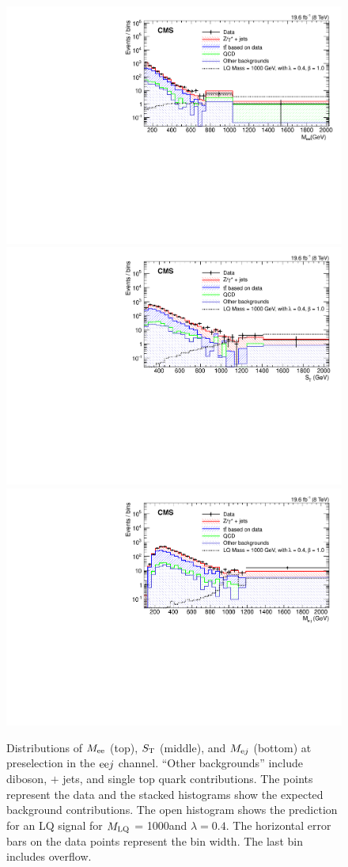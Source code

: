 \begin{figure}[!htb]
       \centering
       {\includegraphics[width=.75\textwidth]{Figures/Figures_ee_M_HEEPele1ele2_Preselection.pdf}}
       {\includegraphics[width=.75\textwidth]{Figures/Figures_ee_ST_pf_ee_single_Preselection.pdf}}
       {\includegraphics[width=.75\textwidth]{Figures/Figures_ee_M_singleLQ_epfjet_Masshigh_Preselection.pdf}}
       \caption{Distributions of $M_{\mathrm{e} \mathrm{e}}$ (top), $S_{\mathrm{T}}$ (middle), and $M_{\mathrm{e} j}$ (bottom) at preselection in the $\mathrm{e} \mathrm{e} j$ channel.  ``Other backgrounds'' include diboson, \PW $+$ jets, and single top quark contributions.  The points represent the data and the stacked histograms show the expected background contributions.  The open histogram shows the prediction for an LQ signal for $M_{\text{\text{LQ}}}$ = 1000\GeV and $\lambda=0.4$.  The horizontal error bars on the data points represent the bin width.  The last bin includes overflow. \label{figapp:elemisc}}
\end{figure}

